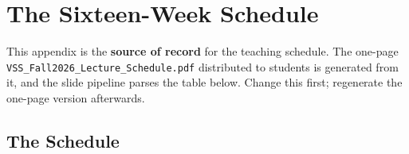 \chapter{The Sixteen-Week Schedule}\label{app:schedule}
\normalfigures

This appendix is the \textbf{source of record} for the teaching schedule. The
one-page \texttt{VSS\_Fall2026\_Lecture\_Schedule.pdf} distributed to students
is generated from it, and the slide pipeline parses the table below. Change
this first; regenerate the one-page version afterwards.

\section{The Schedule}


